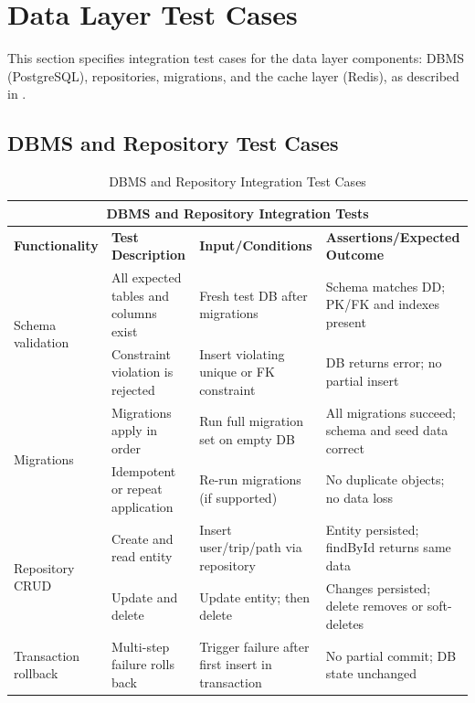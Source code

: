 \section{Data Layer Test Cases}
\label{sec:data_layer_test_cases}%

This section specifies integration test cases for the data layer components: DBMS (PostgreSQL), repositories, migrations, and the cache layer (Redis), as described in .

\subsection{DBMS and Repository Test Cases}
\label{subsec:data_layer_dbms_test_cases}%

\begin{table}[ht]
\centering
\begin{tabular}{|p{3.2cm}|p{3.8cm}|p{3.2cm}|p{4.8cm}|}
\hline
\multicolumn{4}{|c|}{\textbf{DBMS and Repository Integration Tests}} \\ 
\hline
\textbf{Functionality} & \textbf{Test Description} & \textbf{Input/Conditions} & \textbf{Assertions/Expected Outcome} \\
\hline
\multirow{2}{*}{Schema validation}
 & All expected tables and columns exist
 & Fresh test DB after migrations
 & Schema matches DD; PK/FK and indexes present \\ \cline{2-4}
 & Constraint violation is rejected
 & Insert violating unique or FK constraint
 & DB returns error; no partial insert \\
\hline
\multirow{2}{*}{Migrations}
 & Migrations apply in order
 & Run full migration set on empty DB
 & All migrations succeed; schema and seed data correct \\ \cline{2-4}
 & Idempotent or repeat application
 & Re-run migrations (if supported)
 & No duplicate objects; no data loss \\
\hline
\multirow{2}{*}{Repository CRUD}
 & Create and read entity
 & Insert user/trip/path via repository
 & Entity persisted; findById returns same data \\ \cline{2-4}
 & Update and delete
 & Update entity; then delete
 & Changes persisted; delete removes or soft-deletes \\
\hline
Transaction rollback
 & Multi-step failure rolls back
 & Trigger failure after first insert in transaction
 & No partial commit; DB state unchanged \\
\hline
\end{tabular}
\caption{DBMS and Repository Integration Test Cases}
\label{tab:test_cases_data_layer_dbms}
\end{table}

